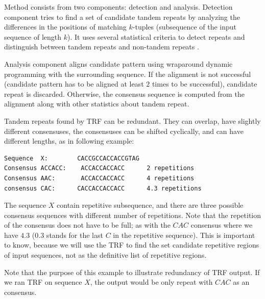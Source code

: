 Method consists from two components: detection and analysis. Detection
component tries to find a set of candidate tandem repeats by analyzing the
differences in the positions of matching $k$-tuples (subsequence of the input
sequence of length $k$). It uses several statistical criteria to detect repeats
and distinguish between tandem repeats and non-tandem repeats
\cite{Benson1999}.

Analysis component aligns candidate pattern using wraparound dynamic
programming \cite{Myers1989} with the surrounding sequence. If the alignment is
not successful (candidate pattern has to be aligned at least $2$ times to be
successful), candidate repeat is discarded. Otherwise, the consensus sequence
is computed from the alignment along with other statistics about tandem repeat.


Tandem repeats found by TRF can be redundant.  They can overlap, have slightly
different consensuses, the consensuses can be shifted cyclically, and can have
different lengths, as in following example:

\begin{verbatim}
Sequence  X:        CACCGCCACCACCGTAG
Consensus ACCACC:    ACCACCACCACC      2 repetitions
Consensus AAC:       ACCACCACCACC      4 repetitions
consensus CAC:      CACCACCACCACC      4.3 repetitions
\end{verbatim}

The sequence $X$ contain repetitive subsequence, and there are three possible
consensus sequences with different number of repetitions. Note that the
repetition of the consensus does not have to be full; as with the $CAC$
consensus where we have $4.3$ ($0.3$ stands for the last $C$ in the repetitive
sequence). This is important to know, because we will use the TRF to find
the set candidate repetitive regions of input sequences, not as the definitive
list of repetitive regions.

Note that the purpose of this example to illustrate redundancy of TRF output.
If we ran TRF on sequence $X$, the output would be only repeat with $CAC$ as an
consensus.

